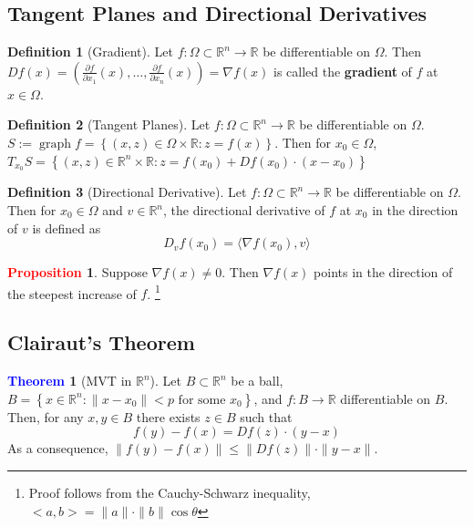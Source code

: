 \documentclass[11pt]{article}
\theoremstyle{definition}
\theoremstyle{definition}
\newcommand{\R}[0]{\mathbb{R}}
\newcommand{\pdv}[2]{\frac{\partial #1}{\partial #2}}
\newtheorem{theorem}{\textcolor{blue}{Theorem}}
\theoremstyle{definition}
\newtheorem{definition}{\textcolor{OliveGreen}{Definition}}
\newtheorem{prop}{\textcolor{red}{Proposition}}
\theoremstyle{remark}
\begin{document}
\subsection{Tangent Planes and Directional Derivatives}

\begin{definition}[Gradient]
Let $f : \Omega \subset \R^n \to \R$ be differentiable on $\Omega$. Then 
$Df(x) = (\pdv{f}{x_1}(x), \dots, \pdv{f}{x_n}(x)) = \nabla f(x)$ is called the \textbf{gradient} of 
$f$ at $x \in \Omega$. 
\end{definition}

\begin{definition}[Tangent Planes]
Let $f : \Omega \subset \R^n \to \R$ be differentiable on $\Omega$. 
$S := \operatorname{graph}f = \left\{ (x, z) \in \Omega \times \R : z = f(x) \right\} $.
Then for $x_0 \in \Omega$, $T_{x_0}S = \left\{ (x, z) \in \R^n \times \R :
z = f(x_0) + Df(x_0) \cdot (x - x_0) \right\} $  
\end{definition}

\begin{definition}[Directional Derivative]
    Let $f : \Omega \subset \R^n \to \R$ be differentiable on $\Omega$. Then for $x_0 \in \Omega$ and 
    $v \in \R^n$, the directional derivative of $f$ at $x_0$ in the direction of $v$ is defined as
    \[
        D_vf(x_0) = \langle \nabla f(x_0), v \rangle
    \] 
    
\end{definition}

\begin{prop}
    Suppose $\nabla f(x) \neq 0$. Then $\nabla f(x)$ points in the direction of the steepest
    increase of $f$. \footnote{Proof follows from the Cauchy-Schwarz inequality, $<a, b> = \|a\| \cdot \|b\| \cos \theta$  }   
\end{prop}

\subsection{Clairaut's Theorem}

\begin{theorem}[MVT in $\R^n$]
    Let $B \subset \R^n$ be a ball, $B = \left\{ x \in \R^n  : \| x - x_0 \| < p \text{ for some } x_0
    \right\} $, and $f : B \to \R$ differentiable on $B$. Then, for any $x, y \in B$ there exists
    $z \in B$ such that     
    \[
        f(y) - f(x) = Df(z) \cdot (y - x)
    \] 
    As a consequence, $\| f(y) - f(x) \| \leq \| Df(z) \| \cdot \| y - x \|$.   
\end{theorem}
\end{document}
